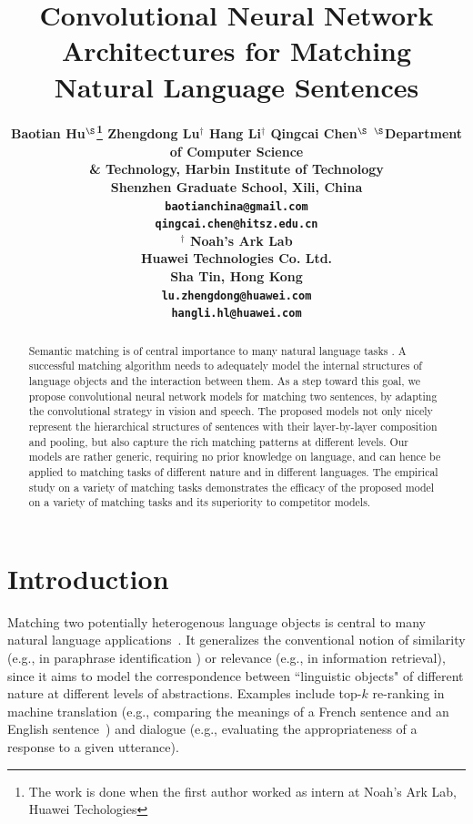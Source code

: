 \documentclass{article} %
\title{Convolutional Neural Network  Architectures for Matching Natural Language Sentences}
\author{
\bf{Baotian Hu}$^\mathbf{\S}$\thanks{The work is done when the first author worked as intern at
Noah's Ark Lab, Huawei Techologies}
\And
\bf{Zhengdong Lu}$^\mathbf{\dag}$
\And
\bf{Hang Li}$^\mathbf{\dag}$
\And
\bf{Qingcai Chen}$^\mathbf{\S}$
\AND
$^\mathbf{\S}$Department of Computer Science\\
\& Technology, Harbin Institute of Technology\\
Shenzhen Graduate School, Xili, China \\
\texttt{baotianchina@gmail.com}\\
\texttt{qingcai.chen@hitsz.edu.cn}\\
\And
$^\mathbf{\dag}$ Noah's Ark Lab \\
Huawei Technologies Co. Ltd.\\
Sha Tin, Hong Kong \\
\texttt{lu.zhengdong@huawei.com}\\
\texttt{hangli.hl@huawei.com}\\
}
\begin{document}
\maketitle

\begin{abstract}
Semantic matching is of central importance to many natural language tasks \cite{bordes2014semantic,RetrievalQA}. A successful matching algorithm needs to adequately model the internal structures of language objects and the interaction between them. As a step toward this goal, we propose convolutional neural network models for matching two sentences, by adapting the convolutional strategy in vision and speech.  The proposed models not only nicely represent the hierarchical structures of sentences with their layer-by-layer composition and pooling, but also capture the rich matching patterns at different levels. Our models are rather generic, requiring no prior knowledge on language, and can hence be applied to matching tasks of different nature and in different languages. The empirical study on a variety of matching tasks demonstrates the efficacy of the proposed model on a variety of matching tasks and its superiority to competitor models.
\end{abstract}

\section{Introduction} \vspace{-10pt}
Matching two potentially heterogenous language objects is central to many natural language applications~\cite{RetrievalQA,bordes2014semantic}. It generalizes the conventional notion of similarity (e.g., in paraphrase identification \cite{socher2011}) or relevance (e.g., in information retrieval\cite{wu2013learning}), since it aims to model the correspondence between ``linguistic objects" of different nature at different levels of abstractions. Examples include top-$k$ re-ranking in  machine translation (e.g., comparing the meanings of a French sentence and an English sentence~\cite{ibmmodel}) and dialogue (e.g., evaluating the appropriateness of a response to a given utterance\cite{emnlpmatch}).
\end{document}
